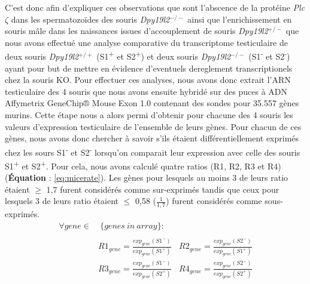 \documentclass[12pt,twoside]{reedthesis}
\theoremstyle{definition}
\theoremstyle{definition}
\theoremstyle{remark}
\begin{document}
  C'est donc afin d'expliquer ces observations que sont l'abscence de la
  protéine \emph{Plc}\(\zeta\) dans les spermatozoïdes des souris
  \emph{Dpy19l2}\(^{-/-}\) ainsi que l'enrichissement en souris mâle dans
  les naissances issues d'accouplement de souris \emph{Dpy19l2}\(^{+/-}\)
  que nous avons effectué une analyse comparative du transcriptome
  testiculaire de deux souris \emph{Dpy19l2}\(^{+/+}\)
  (S1\textsuperscript{+} et S2\textsuperscript{+}) et deux souris
  \emph{Dpy19l2}\(^{-/-}\) (S1\textsuperscript{-} et
  S2\textsuperscript{-}) ayant pour but de mettre en évidence d'eventuels
  dereglement transcriptionels chez la souris KO. Pour effectuer ces
  analyses, nous avons donc extrait l'ARN testiculaire des 4 souris que
  nous avons ensuite hybridé sur des puces à ADN Affymetrix GeneChip®
  Mouse Exon 1.0 contenant des sondes pour 35.557 gènes murins. Cette
  étape nous a alors permi d'obtenir pour chacune des 4 souris les valeurs
  d'expression testiculaire de l'ensemble de leurs gènes. Pour chacun de
  ces gènes, nous avons donc chercher à savoir s'ils étaient
  différentiellement exprimés chez les sours S1\textsuperscript{-} et
  S2\textsuperscript{-} lorsqu'on comparait leur expression avec celle des
  souris S1\textsuperscript{+} et S2\textsuperscript{+}. Pour cela, nous
  avons calculé quatre ratios (R1, R2, R3 et R4) (\textbf{Équation} :
  \eqref{eq:micerate}). Les gènes pour lesquels au moins 3 de leurs ratio
  étaient \(\ge\) 1,7 furent considérés comme sur-exprimés tandis que ceux
  pour lesquels 3 de leurs ratio étaient \(\le\) 0,58 (\(\frac{1}{1,7}\))
  furent considérés comme sous-exprimés.\\
  
  \begin{equation} 
  \begin{split}
  \forall gene \in & \ \{genes\ in\ array\}: \\
  \\
  & R1_{gene} = \frac{exp_{gene}(S1^-)}{exp_{gene}(S1^+)} \ \ \ \ R2_{gene} = \frac{exp_{gene}(S2^-)}{exp_{gene}(S1^+)} \\
  & R3_{gene} = \frac{exp_{gene}(S1^-)}{exp_{gene}(S2^+)} \ \ \ \ R4_{gene} = \frac{exp_{gene}(S2^-)}{exp_{gene}(S2^+)} 
  \label{eq:micerate}
  \end{split}
  \end{equation}
  
\end{document}
